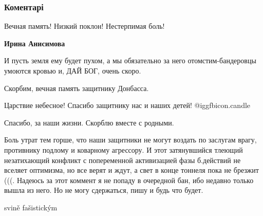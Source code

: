  
 
 
 
 
\subsubsection{Коментарі}
\label{sec:28_11_2021.fb.fb_group.respublika_lnr.1.obstrel_gibel.cmt}

Вечная память! Низкий поклон! Нестерпимая боль!

\textbf{Ирина Анисимова} 

И пусть земля ему будет пухом, а мы обязательно за него отомстим-бандеровцы
умоются кровью и, ДАЙ БОГ, очень скоро.

Скорбим, вечная память защитнику Донбасса.

Царствие небесное! Спасибо защитнику нас и наших детей!  @igg{fbicon.candle} 

Спасибо, за наши жизни. Скорблю вместе с родными.


Боль утрат тем горше, что наши защитники не могут воздать по заслугам врагу,
противнику подлому и коварному агрессору. И этот затянувшийся тлеющий
незатихающий конфликт с попеременной активизацией фазы б.действий не вселяет
оптимизма, но все верят и ждут, а свет в конце тоннеля пока не брезжит (((.
Надеюсь за этот коммент я не попаду в очередной бан, ибо недавно только вышла
из него. Но не могу сдержаться, пишу и будь что будет.

svině fašistickým
